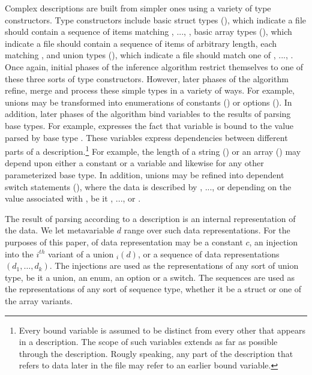 Complex descriptions are built from simpler ones using a variety of
type constructors.  Type constructors include
basic struct types (), which indicate a file 
should contain a sequence of items matching , ..., ,
basic array types (), which indicate a file should contain
a sequence of items of arbitrary length, each matching ,
and union types (), which indicate a file
should match one of , ..., .  Once again, initial phases
of the inference algorithm restrict themselves to one of these three
sorts of type constructors.  However, later phases of the algorithm
refine, merge and process these simple types in a variety of ways.
For example, unions may be transformed into 
enumerations of constants
() or options ().  In
addition, later phases of the algorithm 
bind variables to the results of parsing 
base types.  For example,  expresses the fact that
variable  is bound to the value parsed by base type
.  These variables express dependencies between 
different parts
of a description.\footnote{Every bound variable is assumed to be distinct
from every other that appears in a description.  The scope of such variables
extends as far as possible through the description.  Rougly speaking,
any part of the 
description that refers to data later in the file may refer to an earlier
bound variable.}  For example, the length of a string ()
or an array () may depend upon either a constant or
a variable and likewise for any other parameterized base type.  In
addition, unions may be refined into dependent switch statements
(), where the
data is described by , ..., or  depending on the value
associated with , be it , ..., or .

The result of parsing according to a description is an internal
representation of the data. We let metavariable $d$ range over such 
data representations.  For the purposes of this paper, of data 
representation may be a constant $c$, an injection into the $i^{th}$
variant of a union $_i(d)$, or a sequence of data representations
$(d_1,\ldots,d_k)$.  The injections are used as the representations of
any sort of union type, be it a union, an enum, an option or a switch.
The sequences are used as the representations of any sort of sequence
type, whether it be a struct or one of the array variants.

